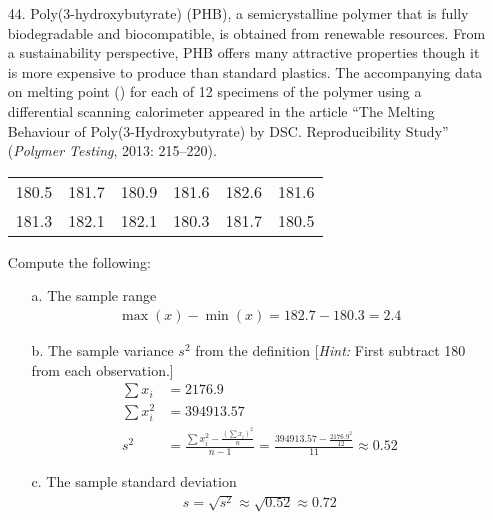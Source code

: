 \documentclass[letterpaper,12pt]{article}
\begin{document}
\maketitle

\begin{enumerate}
  \item[44.]
    Poly(3-hydroxybutyrate) (PHB), a semicrystalline polymer that is fully biodegradable and biocompatible, is obtained from renewable resources. From a sustainability perspective, PHB offers many attractive properties though it is more expensive to produce than standard plastics. The accompanying data on melting point (\textcelsius) for each of 12 specimens of the polymer using a differential scanning calorimeter appeared in the article ``The Melting Behaviour of Poly(3-Hydroxybutyrate) by DSC. Reproducibility Study'' (\textit{Polymer Testing}, 2013: 215–220).
    \begin{center}
      \begin{tabular}{*{6}{c}}
        180.5 & 181.7 & 180.9 & 181.6 & 182.6 & 181.6 \\
        181.3 & 182.1 & 182.1 & 180.3 & 181.7 & 180.5
      \end{tabular}
    \end{center}
    Compute the following:
    \begin{enumerate}
      \item[a.]
        The sample range
        \begin{align*}
          \max(x) - \min(x) = 182.7 - 180.3 = 2.4
        \end{align*}
      \item[b.]
        The sample variance $s^2$ from the definition [\textit{Hint:} First subtract 180 from each observation.]
        \begin{align*}
          \sum{x_i} &= 2176.9 \\
          \sum{x_i^2} &= 394913.57 \\
          s^2 &= \frac{\sum{x_i^2} - \frac{(\sum{x_i})^2}{n}}{n - 1} = \frac{394913.57 - \frac{2176.9^2}{12}}{11} \approx 0.52
        \end{align*}
      \item[c.] The sample standard deviation
        \begin{align*}
          s = \sqrt{s^2} \approx \sqrt{0.52} \approx 0.72
        \end{align*}
    \end{enumerate}


\end{enumerate}
\end{document}
